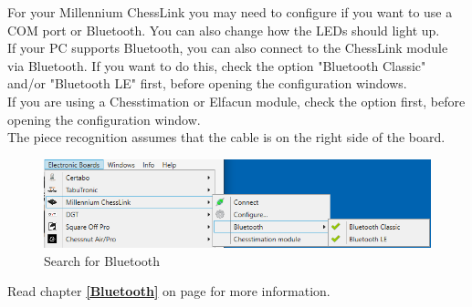 \documentclass[11pt,a4paper]{article}
\begin{document}
For your Millennium ChessLink you may need to configure if you want to use a COM port or Bluetooth. You can also change how the LEDs should light up.\\
If your PC supports Bluetooth, you can also connect to the ChessLink module via Bluetooth. If you want to do this, check the option "Bluetooth Classic" and/or "Bluetooth LE" first, before opening the configuration windows.\\
If you are using a Chesstimation or Elfacun module, check the option first, before opening the configuration window.\\
The piece recognition assumes that the cable is on the right side of the board.

\begin{figure}[H]
	\centering
	\includegraphics[scale=0.7]{MillenniumChessLink9.png}
	\caption{Search for Bluetooth}
	\label{fig:MillenniumChessLink9}
\end{figure}
Read chapter \textbf{\ref{Bluetooth}  } on page \pageref{Bluetooth} for more information.
\end{document}
